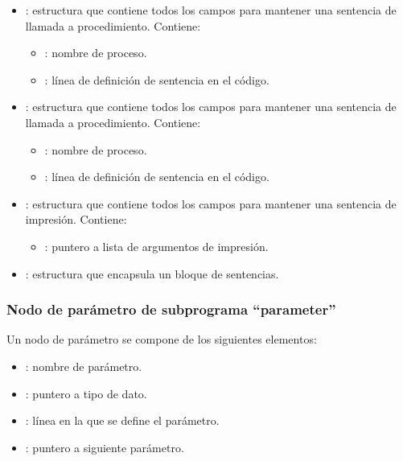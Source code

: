 \begin{itemize}
\begin{itemize}
        \item {} : estructura que contiene todos los campos para mantener una sentencia de llamada a procedimiento. Contiene:
        \begin{itemize}
            \item {}: nombre de proceso.
            \item {} : línea de definición de sentencia en el código.
        \end{itemize}
    \end{itemize}
    \begin{itemize}
        \item {} : estructura que contiene todos los campos para mantener una sentencia de llamada a procedimiento. Contiene:
        \begin{itemize}
            \item {}: nombre de proceso.
            \item {} : línea de definición de sentencia en el código.
        \end{itemize}
    \end{itemize}
    \begin{itemize}
        \item {} : estructura que contiene todos los campos para mantener una sentencia de impresión. Contiene:
        \begin{itemize}
            \item {}: puntero a lista de argumentos de impresión.
        \end{itemize}
    \end{itemize}
    \begin{itemize}
        \item {} : estructura que encapsula un bloque de sentencias.
    \end{itemize}
\end{itemize}

\subsubsection{Nodo de parámetro de subprograma ``parameter''}
\noindent
Un nodo de parámetro se compone de los siguientes elementos:
\begin{itemize}
    \item {} : nombre de parámetro.
    \item {} : puntero a tipo de dato.
    \item {} : línea en la que se define el parámetro.
    \item {} : puntero a siguiente parámetro.
\end{itemize}

